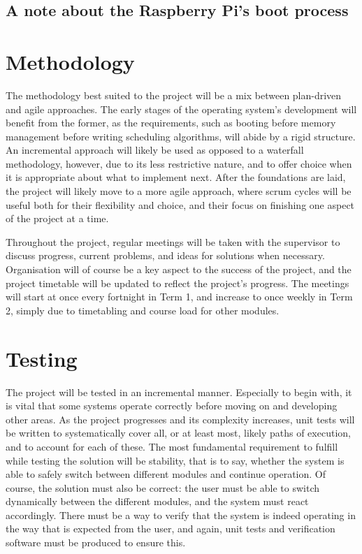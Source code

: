 \documentclass[10pt,a4paper]{article}
\begin{document}
\subsection*{A note about the Raspberry Pi's boot process}

\section*{Methodology}
The methodology best suited to the project will be a mix between plan-driven and
agile approaches. The early stages of the operating system's development will
benefit from the former, as the requirements, such as booting before memory
management before writing scheduling algorithms, will abide by a rigid
structure. An incremental approach will likely be used as opposed to a waterfall
methodology, however, due to its less restrictive nature, and to offer choice
when it is appropriate about what to implement next. After the foundations are
laid, the project will likely move to a more agile approach, where scrum cycles
will be useful both for their flexibility and choice, and their focus on
finishing one aspect of the project at a time.

Throughout the project, regular meetings will be taken with the supervisor to
discuss progress, current problems, and ideas for solutions when necessary.
Organisation will of course be a key aspect to the success of the project, and
the project timetable will be updated to reflect the project's progress. The
meetings will start at once every fortnight in Term 1, and increase to once
weekly in Term 2, simply due to timetabling and course load for other modules.

\section*{Testing}
The project will be tested in an incremental manner. Especially to begin with,
it is vital that some systems operate correctly before moving on and developing
other areas. As the project progresses and its complexity increases, unit tests
will be written to systematically cover all, or at least most, likely paths of
execution, and to account for each of these. The most fundamental requirement to
fulfill while testing the solution will be stability, that is to say, whether
the system is able to safely switch between different modules and continue
operation. Of course, the solution must also be correct: the user must be able
to switch dynamically between the different modules, and the system must react
accordingly. There must be a way to verify that the system is indeed operating
in the way that is expected from the user, and again, unit tests and
verification software must be produced to ensure this.
\end{document}
